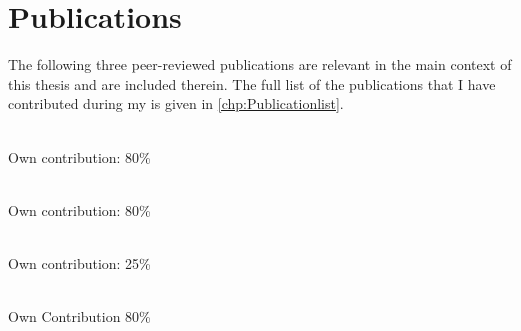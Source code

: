 \noindent
 
\chapter*{Publications}


The following three peer-reviewed publications are relevant in the main context of this thesis and are included therein. The full list of the publications that I have contributed during my is given in \autoref{chp:Publicationlist}.\\


\noindent{}\\ \strut \hfill Own contribution: 80\%\\

\noindent{}\\ \strut \hfill Own contribution: 80\%\\

\noindent{}\\ \strut \hfill Own contribution: 25\%\\
\noindent{}\\ \strut \hfill Own Contribution 80\%\\



